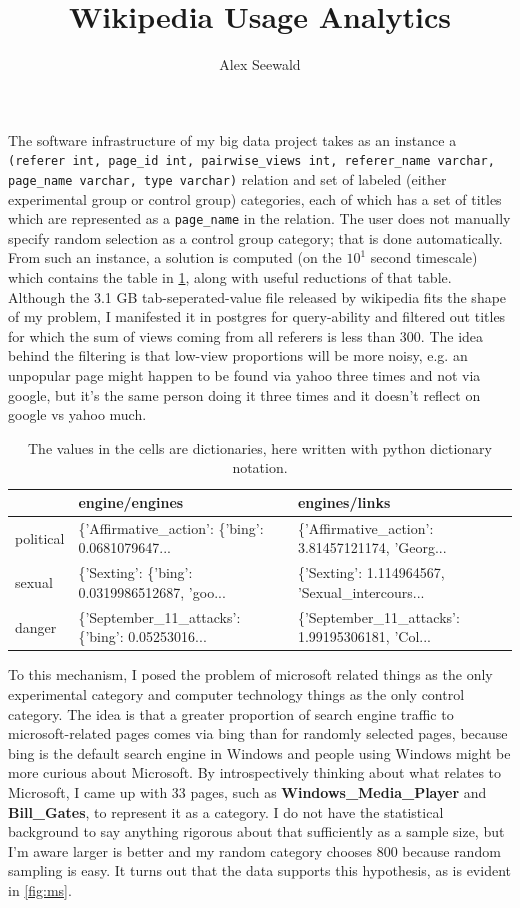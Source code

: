\documentclass{article}
\author{Alex Seewald}
\title{Wikipedia Usage Analytics}
\begin{document}
\maketitle

The software infrastructure of my big data project takes as an instance a \texttt{(referer int, page\_id int, pairwise\_views int, referer\_name varchar, page\_name varchar, type varchar)} relation and set of labeled (either experimental group or control group) categories, each of which has a set of titles which are represented as a \texttt{page\_name} in the relation. The user does not manually specify random selection as a control group category; that is done automatically. From such an instance, a solution is computed (on the $10^1$ second timescale) which contains the table in \cref{tab:struct}, along with useful reductions of that table. Although the 3.1 GB tab-seperated-value file released by wikipedia fits the shape of my problem, I manifested it in postgres for query-ability and filtered out titles for which the sum of views coming from all referers is less than 300. The idea behind the filtering is that low-view proportions will be more noisy, e.g. an unpopular page might happen to be found via yahoo three times and not via google, but it’s the same person doing it three times and it doesn’t reflect on google vs yahoo much.

\begin{table}[H]
\begin{tabular}{lll}
\toprule
{} &                                     engine/engines &                                      engines/links \\
\midrule
political &  \{'Affirmative\_action': \{'bing': 0.0681079647... &  \{'Affirmative\_action': 3.81457121174, 'Georg... \\
sexual    &  \{'Sexting': \{'bing': 0.0319986512687, 'goo... &  \{'Sexting': 1.114964567, 'Sexual\_intercours... \\
danger    &  \{'September\_11\_attacks': \{'bing': 0.05253016... &  \{'September\_11\_attacks': 1.99195306181, 'Col... \\
\bottomrule
\end{tabular}
\caption{The values in the cells are dictionaries, here written with python dictionary notation.}
\label{tab:struct}
\end{table}

To this mechanism, I posed the problem of microsoft related things as the only experimental category and computer technology things as the only control category. The idea is that a greater proportion of search engine traffic to microsoft-related pages comes via bing than for randomly selected pages, because bing is the default search engine in Windows and people using Windows might be more curious about Microsoft. By introspectively thinking about what relates to Microsoft, I came up with 33 pages, such as \textbf{Windows\_Media\_Player} and \textbf{Bill\_Gates}, to represent it as a category. I do not have the statistical background to say anything rigorous about that sufficiently as a sample size, but I’m aware larger is better and my random category chooses 800 because random sampling is easy. It turns out that the data supports this hypothesis, as is evident in \cref{fig:ms}.
\end{document}
